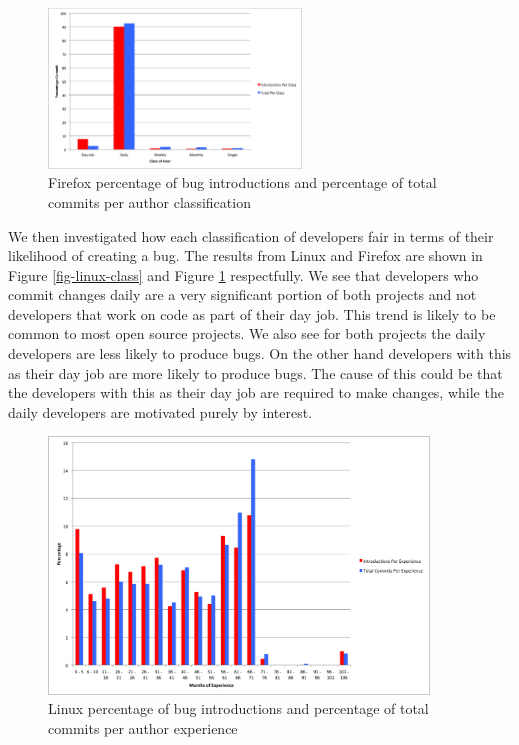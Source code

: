\begin{figure}
\begin{center}
\includegraphics[width=0.6\textwidth]{firefox_per_class.png}
\end{center}
\caption{Firefox percentage of bug introductions and percentage of total commits per author classification}
\label{fig-firefox-class}
\end{figure}

We then investigated how each classification of developers fair in
terms of their likelihood of creating a bug. The results from Linux
and Firefox are shown in Figure \ref{fig-linux-class} and Figure
\ref{fig-firefox-class} respectfully. We see that developers who
commit changes daily are a very significant portion of both projects
and not developers that work on code as part of their day job. This
trend is likely to be common to most open source projects. We also see
for both projects the daily developers are less likely to produce
bugs. On the other hand developers with this as their day job are more
likely to produce bugs. The cause of this could be that the developers
with this as their day job are required to make changes, while the
daily developers are motivated purely by interest.

\begin{figure}
\begin{center}
\includegraphics[width=0.9\textwidth]{linux_day_per_experience.png}
\end{center}
\caption{Linux percentage of bug introductions and percentage of total commits per author experience}
\label{fig-linux-experience}
\end{figure}

